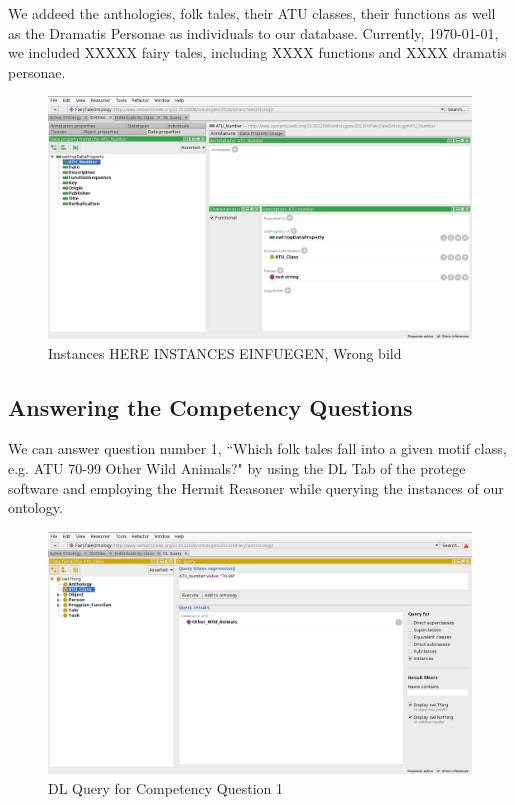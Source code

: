 \documentclass[10pt,a4paper]{article}
\begin{document}
We addeed the anthologies, folk tales, their ATU classes, their functions as well as the Dramatis Personae as individuals to our database. Currently, \today , we included XXXXX fairy tales, including XXXX functions and XXXX dramatis personae.
\begin{figure}[H]
\centering
 	\includegraphics[scale=0.25]{Screen5.png}
 	\caption{Instances HERE INSTANCES EINFUEGEN, Wrong bild}
\end{figure}
\newpage
\subsection{Answering the Competency Questions} 

We can answer question number 1, ``Which folk tales fall into a given motif class, e.g. ATU 70-99 Other Wild Animals?" by using the DL Tab of the protege software and employing the Hermit Reasoner while querying the instances of our ontology. 
\begin{figure}[H]

\centering
 	\includegraphics[scale=0.2]{Screen6.png}
 	\caption{DL Query for Competency Question 1}
\end{figure}
\end{document}
